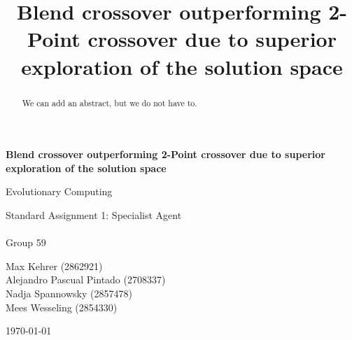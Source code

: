\documentclass[sigconf,nonacm]{acmart}
\begin{document}
\begin{titlepage}
    \centering
    \vspace*{1cm}

    \Huge
    \textbf{Blend crossover outperforming 2-Point crossover due to superior exploration of the solution space}

    \vspace{0.5cm}
    \LARGE
    Evolutionary Computing

    \vspace{1.5cm}
    Standard Assignment 1: Specialist Agent \\ \\
    Group 59

    \vspace{1.5cm}
    Max Kehrer (2862921) \\
    Alejandro Pascual Pintado (2708337) \\
    Nadja Spannowsky (2857478) \\
    Mees Wesseling (2854330)

    \vspace{1.5cm}
    \today

    \vfill
\end{titlepage}

\title{Blend crossover outperforming 2-Point crossover due to superior exploration of the solution space}

\begin{abstract}
We can add an abstract, but we do not have to.
\end{abstract}


\maketitle



\clearpage

%

\end{document}
